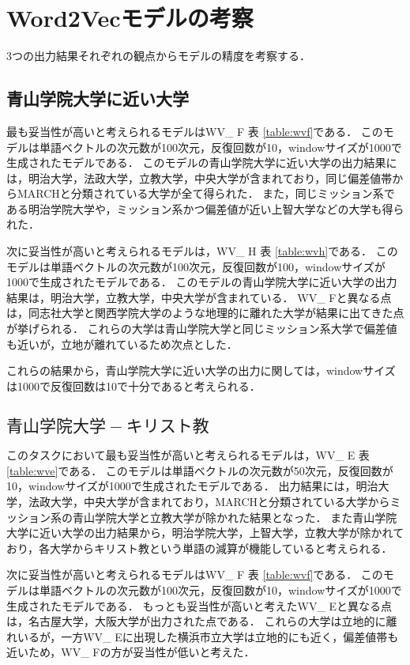 \section{Word2Vecモデルの考察}
3つの出力結果それぞれの観点からモデルの精度を考察する．

\subsection{青山学院大学に近い大学}
最も妥当性が高いと考えられるモデルはWV\_ F 表 \ref{table:wvf}である．
このモデルは単語ベクトルの次元数が100次元，反復回数が10，windowサイズが1000で生成されたモデルである．
このモデルの青山学院大学に近い大学の出力結果には，明治大学，法政大学，立教大学，中央大学が含まれており，同じ偏差値帯からMARCHと分類されている大学が全て得られた．
また，同じミッション系である明治学院大学や，ミッション系かつ偏差値が近い上智大学などの大学も得られた．

次に妥当性が高いと考えられるモデルは，WV\_ H 表 \ref{table:wvh}である．
このモデルは単語ベクトルの次元数が100次元，反復回数が100，windowサイズが1000で生成されたモデルである．
このモデルの青山学院大学に近い大学の出力結果は，明治大学，立教大学，中央大学が含まれている．
WV\_ Fと異なる点は，同志社大学と関西学院大学のような地理的に離れた大学が結果に出てきた点が挙げられる．
これらの大学は青山学院大学と同じミッション系大学で偏差値も近いが，立地が離れているため次点とした．

これらの結果から，青山学院大学に近い大学の出力に関しては，windowサイズは1000で反復回数は10で十分であると考えられる．

\subsection{$ 青山学院大学 - キリスト教 $}
このタスクにおいて最も妥当性が高いと考えられるモデルは，WV\_ E 表 \ref{table:wve}である．
このモデルは単語ベクトルの次元数が50次元，反復回数が10，windowサイズが1000で生成されたモデルである．
出力結果には，明治大学，法政大学，中央大学が含まれており，MARCHと分類されている大学からミッション系の青山学院大学と立教大学が除かれた結果となった．
また青山学院大学に近い大学の出力結果から，明治学院大学，上智大学，立教大学が除かれており，各大学からキリスト教という単語の減算が機能していると考えられる．


次に妥当性が高いと考えられるモデルはWV\_ F 表 \ref{table:wvf}である．
このモデルは単語ベクトルの次元数が100次元，反復回数が10，windowサイズが1000で生成されたモデルである．
もっとも妥当性が高いと考えたWV\_ Eと異なる点は，名古屋大学，大阪大学が出力された点である．
これらの大学は立地的に離れいるが，一方WV\_ Eに出現した横浜市立大学は立地的にも近く，偏差値帯も近いため，WV\_ Fの方が妥当性が低いと考えた．


